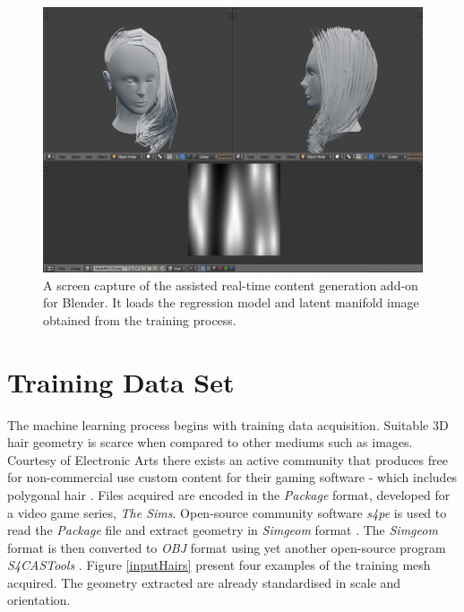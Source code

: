 \documentclass[ %
author={Dillon Keith Diep},
supervisor={Dr. Carl Henrik Ek},
degree={MEng},
title={ART-CG Hair:},
subtitle={Assisted Real-time Content Generation of Stylised Virtual Hair},
type={Research},
year={2017} ]{dissertation}
\begin{document}
\begin{figure}[!h]
	\centering
	\includegraphics[scale=0.3]{images/latentHairAddon}
	\caption{A screen capture of the assisted real-time content generation add-on for Blender. It loads the regression model and latent manifold image obtained from the training process.}
	\label{latentAddon}
\end{figure}

\section{Training Data Set}
The machine learning process begins with training data acquisition. Suitable 3D hair geometry is scarce when compared to other mediums such as images. Courtesy of Electronic Arts there exists an active community that produces free for non-commercial use custom content for their gaming software - which includes polygonal hair \cite{tsr}. Files acquired are encoded in the \textit{Package} format, developed for a video game series, \textit{The Sims}. Open-source community software \textit{s4pe} is used to read the \textit{Package} file and extract geometry in \textit{Simgeom} format \cite{s4pe}. The \textit{Simgeom} format is then converted to \textit{OBJ} format using yet another open-source program \textit{S4CASTools} \cite{s4cas}. Figure \ref{inputHairs} present four examples of the training mesh acquired. The geometry extracted are already standardised in scale and orientation.
\end{document}
